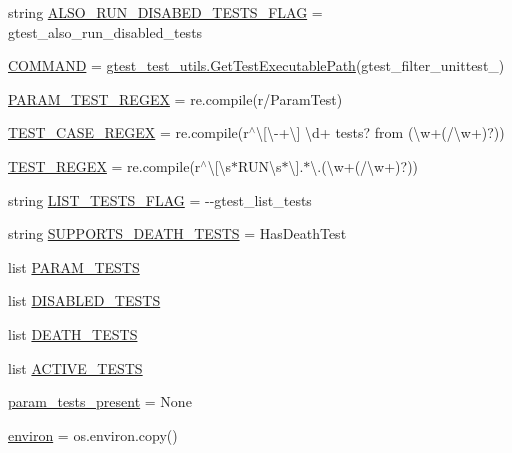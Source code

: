 \begin{DoxyCompactItemize}
\item 
string \hyperlink{namespacegtest__filter__unittest_aa2da713fbaa08fdbaa7cd78c45974edf}{A\+L\+S\+O\+\_\+\+R\+U\+N\+\_\+\+D\+I\+S\+A\+B\+E\+D\+\_\+\+T\+E\+S\+T\+S\+\_\+\+F\+L\+AG} = \textquotesingle{}gtest\+\_\+also\+\_\+run\+\_\+disabled\+\_\+tests\textquotesingle{}
\item 
\hyperlink{namespacegtest__filter__unittest_aaf600b005b9c09e727b55b60fdf8f507}{C\+O\+M\+M\+A\+ND} = \hyperlink{namespacegtest__test__utils_a89ed3717984a80ffbb7a9c92f71b86a2}{gtest\+\_\+test\+\_\+utils.\+Get\+Test\+Executable\+Path}(\textquotesingle{}gtest\+\_\+filter\+\_\+unittest\+\_\+\textquotesingle{})
\item 
\hyperlink{namespacegtest__filter__unittest_a8fbf875f4ea83b2d5239a2e99e080526}{P\+A\+R\+A\+M\+\_\+\+T\+E\+S\+T\+\_\+\+R\+E\+G\+EX} = re.\+compile(r\textquotesingle{}/Param\+Test\textquotesingle{})
\item 
\hyperlink{namespacegtest__filter__unittest_a76b555691fb57191f50a4328134fb4d8}{T\+E\+S\+T\+\_\+\+C\+A\+S\+E\+\_\+\+R\+E\+G\+EX} = re.\+compile(r\textquotesingle{}$^\wedge$\textbackslash{}\mbox{[}\textbackslash{}-\/+\textbackslash{}\mbox{]} \textbackslash{}d+ tests? from (\textbackslash{}w+(/\textbackslash{}w+)?)\textquotesingle{})
\item 
\hyperlink{namespacegtest__filter__unittest_a9327e0f4c9fab06a346228cc5bab53f2}{T\+E\+S\+T\+\_\+\+R\+E\+G\+EX} = re.\+compile(r\textquotesingle{}$^\wedge$\textbackslash{}\mbox{[}\textbackslash{}s$\ast$R\+U\+N\textbackslash{}s$\ast$\textbackslash{}\mbox{]}.$\ast$\textbackslash{}.(\textbackslash{}w+(/\textbackslash{}w+)?)\textquotesingle{})
\item 
string \hyperlink{namespacegtest__filter__unittest_a9b3bb8eda9c6b1716e992d433b1e586c}{L\+I\+S\+T\+\_\+\+T\+E\+S\+T\+S\+\_\+\+F\+L\+AG} = \textquotesingle{}-\/-\/gtest\+\_\+list\+\_\+tests\textquotesingle{}
\item 
string \hyperlink{namespacegtest__filter__unittest_a660f467579ec78f8f856b588c6f6f270}{S\+U\+P\+P\+O\+R\+T\+S\+\_\+\+D\+E\+A\+T\+H\+\_\+\+T\+E\+S\+TS} = \textquotesingle{}Has\+Death\+Test\textquotesingle{}
\item 
list \hyperlink{namespacegtest__filter__unittest_a4c414863f1e2e9ac993ce4afda33f6b9}{P\+A\+R\+A\+M\+\_\+\+T\+E\+S\+TS}
\item 
list \hyperlink{namespacegtest__filter__unittest_affe760ab1e8c4c7b61566076c37c1d69}{D\+I\+S\+A\+B\+L\+E\+D\+\_\+\+T\+E\+S\+TS}
\item 
list \hyperlink{namespacegtest__filter__unittest_ab14d082dc05c07458595606a64616d0b}{D\+E\+A\+T\+H\+\_\+\+T\+E\+S\+TS}
\item 
list \hyperlink{namespacegtest__filter__unittest_a8eb26cb0e0ac81737723cc9d16e1d253}{A\+C\+T\+I\+V\+E\+\_\+\+T\+E\+S\+TS}
\item 
\hyperlink{namespacegtest__filter__unittest_aab31f58fd88fa64c14e6ab5dc5fb8da3}{param\+\_\+tests\+\_\+present} = None
\item 
\hyperlink{namespacegtest__filter__unittest_ab6940a12e110abdd8dea27039f4731ef}{environ} = os.\+environ.\+copy()
\end{DoxyCompactItemize}


